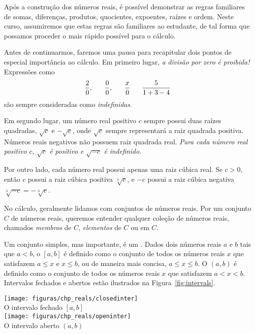 \documentclass{svmono}
\begin{document}
Após a construção dos números reais, é possível demonstrar as
regras familiares de somas, diferenças, produtos, quocientes,
expoentes, raízes e ordem. Neste curso, assumiremos que estas
regras são familiares ao estudante, de tal forma que possamos
proceder o mais rápido possível para o cálculo.

Antes de continuarmos, faremos uma pausa para recapitular dois
pontos de especial importância ao cálculo. Em primeiro lugar,
\emph{a divisão por zero é proibida!} Expressões como
\[
\frac{2}{0}, \hspace{4ex} \frac{0}{0}, \hspace{4ex} \frac{x}{0} \hspace{4ex} \frac{5}{1+3-4}
\]
são sempre consideradas como \emph{indefinidas}.

Em segundo lugar, um número real positivo $c$ sempre possui duas
raízes quadradas, $\sqrt{c}$ e $-\sqrt{c}$, onde $\sqrt{c}$ sempre
representará a raiz quadrada positiva. Números reais negativos não
possuem raiz quadrada real. \emph{Para cada número real positivo
$c$, $\sqrt{c}$ é positivo e $\sqrt{-c}$ é indefinido.}

Por outro lado, cada número real possui apenas uma raiz cúbica real.
Se $c > 0$, então $c$ possui a raiz cúbica positiva $\sqrt[3]{c}$, e $-c$
possui a raiz cúbica negativa $\sqrt[3]{-c} = -\sqrt[3]{c}$.

No cálculo, geralmente lidamos com conjuntos de números reais. Por um
conjunto $C$ de números reais, queremos entender qualquer coleção de
números reais, chamados \emph{membros} de $C$, \emph{elementos} de $C$
ou  em $C$.

Um conjunto simples, mas importante, é um . Dados dois
números reais $a$ e $b$ tais que $a < b$, o
$[a,b]$ é definido como o conjunto de todos os números reais $x$
que satisfazem $a \le x$ e $x \le b$, ou de maneira mais concisa,
$a \le x \le b$.
O  $(a,b)$ é definido como o conjunto de todos
os números reais $x$ que satisfazem $a < x < b$. Intervalos fechados e
abertos estão ilustrados na Figura~\ref{fig:intervals}. 

{
	\texttt{[image: figuras/chp\_reals/closedinter]}\\
	O intervalo fechado $[a,b]$\\[\baselineskip]
	\texttt{[image: figuras/chp\_reals/openinter]}\\
	O intervalo aberto $(a,b)$
}
\end{document}
